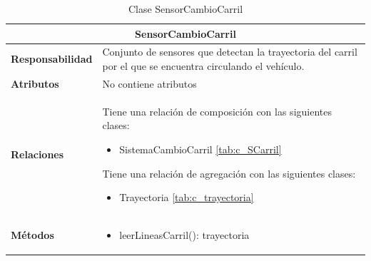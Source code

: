 








\begin{table}[H]
\begin{center}
\begin{tabular}{p{} p{11cm}}
\multicolumn{2}{c}{\textbf{SensorCambioCarril} } \\ \hline \hline
\textbf{Responsabilidad} &  Conjunto de sensores que detectan la trayectoria del carril por el que se encuentra circulando el vehículo. \\ \hline
\textbf{Atributos} & No contiene atributos
                      \\ \hline
\textbf{Relaciones} & \par Tiene una relación de composición con las siguientes clases:
                      \begin{itemize}
                        \item SistemaCambioCarril \ref{tab:c_SCarril}
                      \end{itemize}

                      \par Tiene una relación de agregación con las siguientes clases:
                      \begin{itemize}
                        \item Trayectoria \ref{tab:c_trayectoria}
                      \end{itemize}
                      \\ \hline

\textbf{Métodos} &  \begin{itemize}
                      \item leerLineasCarril(): trayectoria
                      \end{itemize}\\ \hline
\end{tabular}
\caption{Clase SensorCambioCarril}
\label{tab:c_SensorCC}
\end{center}
\end{table}








